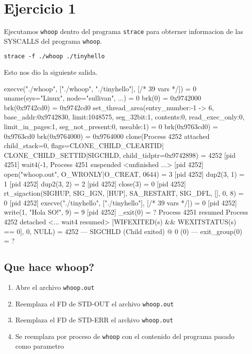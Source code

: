 
\section{Ejercicio 1}

Ejecutamos \verb|whoop| dentro del programa \verb|strace| para obterner informacion de las SYSCALLS del programa \verb|whoop|.

\begin{framed}
\begin{verbatim}
strace -f ./whoop ./tinyhello
\end{verbatim}
\end{framed}

Esto nos dio la siguiente salida.

\begin{framed}
\begin{verbatimtab}
execve("./whoop", ["./whoop", "./tinyhello"], [/* 39 vars */]) = 0
uname({sys="Linux", node="sullivan", ...}) = 0
brk(0)                                  = 0x9742000
brk(0x9742cd0)                          = 0x9742cd0
set_thread_area({entry_number:-1 -> 6, base_addr:0x9742830, limit:1048575, 
  seg_32bit:1, contents:0, read_exec_only:0, limit_in_pages:1, 
  seg_not_present:0, useable:1}) = 0
brk(0x9763cd0)                          = 0x9763cd0
brk(0x9764000)                          = 0x9764000
clone(Process 4252 attached child_stack=0, flags=CLONE_CHILD_CLEARTID|
  CLONE_CHILD_SETTID|SIGCHLD, child_tidptr=0x9742898) = 4252
[pid  4251] wait4(-1, Process 4251 suspended
 <unfinished ...>
[pid  4252] open("whoop.out", O_WRONLY|O_CREAT, 0644) = 3
[pid  4252] dup2(3, 1)                  = 1
[pid  4252] dup2(3, 2)                  = 2
[pid  4252] close(3)                    = 0
[pid  4252] rt_sigaction(SIGHUP, {SIG_IGN, [HUP], SA_RESTART}, 
  {SIG_DFL, [], 0}, 8) = 0
[pid  4252] execve("./tinyhello", ["./tinyhello"], [/* 39 vars */]) = 0
[pid  4252] write(1, "Hola SO!\n", 9)   = 9
[pid  4252] _exit(0)                    = ?
Process 4251 resumed
Process 4252 detached
<... wait4 resumed> [{WIFEXITED(s) && WEXITSTATUS(s) == 0}], 0, NULL) = 4252
--- SIGCHLD (Child exited) @ 0 (0) ---
exit_group(0)                           = ?
\end{verbatimtab}
\end{framed}

\subsection{Que hace whoop?}

\begin{enumerate}
 \item Abre el archivo \verb|whoop.out|
 \item Reemplaza el FD de STD-OUT el archivo \verb|whoop.out|
 \item Reemplaza el FD de STD-ERR el archivo \verb|whoop.out|
 \item Se reemplaza por proceso de \verb|whoop| con el contenido del programa pasado como parametro
\end{enumerate}


